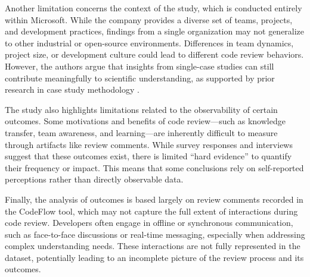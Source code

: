 Another limitation concerns the context of the study, which is conducted entirely within Microsoft. While the company provides a diverse set of teams, projects, and development practices, findings from a single organization may not generalize to other industrial or open-source environments. Differences in team dynamics, project size, or development culture could lead to different code review behaviors. However, the authors argue that insights from single-case studies can still contribute meaningfully to scientific understanding, as supported by prior research in case study methodology \cite{flyvbjerg2006five,basili1999building}.

The study also highlights limitations related to the observability of certain outcomes. Some motivations and benefits of code review—such as knowledge transfer, team awareness, and learning—are inherently difficult to measure through artifacts like review comments. While survey responses and interviews suggest that these outcomes exist, there is limited “hard evidence” to quantify their frequency or impact. This means that some conclusions rely on self-reported perceptions rather than directly observable data.

Finally, the analysis of outcomes is based largely on review comments recorded in the CodeFlow tool, which may not capture the full extent of interactions during code review. Developers often engage in offline or synchronous communication, such as face-to-face discussions or real-time messaging, especially when addressing complex understanding needs. These interactions are not fully represented in the dataset, potentially leading to an incomplete picture of the review process and its outcomes.